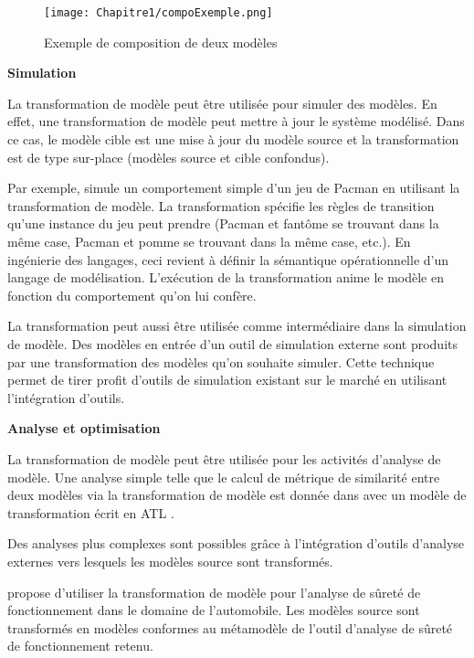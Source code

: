 \begin{description}
\begin{figure}[!htbp]
 \begin{center}
  \texttt{[image: Chapitre1/compoExemple.png]}
 \end{center}
 \caption{Exemple de composition de deux modèles}
 \label{fig:compoExemple}
\end{figure}

\item \textbf{Simulation}

La transformation de modèle peut être utilisée pour simuler des modèles. En effet, une transformation de modèle peut mettre à jour le système modélisé. Dans ce cas, le modèle cible est une mise à jour du modèle source et la transformation est de type sur-place (modèles source et cible confondus). 

Par exemple, \cite{syriani2011multi} simule un comportement simple d'un jeu de Pacman en utilisant la transformation de modèle. La transformation spécifie les règles de transition qu'une instance du jeu peut prendre (Pacman et fantôme se trouvant dans la même case, Pacman et pomme se trouvant dans la même case, etc.). En ingénierie des langages, ceci revient à définir la sémantique opérationnelle d'un langage de modélisation. L'exécution de la transformation anime le modèle en fonction du comportement qu'on lui confère.

La transformation peut aussi être utilisée comme intermédiaire dans la simulation de modèle. Des modèles en entrée d'un outil de simulation externe sont produits par une transformation des modèles qu'on souhaite simuler. Cette technique permet de tirer profit d'outils de simulation existant sur le marché en utilisant l'intégration d'outils.

\item \textbf{Analyse et optimisation}

La transformation de modèle peut être utilisée pour les activités d'analyse de modèle. Une analyse simple telle que le calcul de métrique de similarité entre deux modèles via la transformation de modèle est donnée dans \cite{del2007semi} avec un modèle de transformation écrit en ATL \cite{jouault2006transforming}. 

Des analyses plus complexes sont possibles grâce à l'intégration d'outils d'analyse externes vers lesquels les modèles source sont transformés.

\cite{biehl2010integrating} propose d'utiliser la transformation de modèle pour l'analyse de sûreté de fonctionnement dans le domaine de l'automobile. Les modèles source sont transformés en modèles conformes au métamodèle de l'outil d'analyse de sûreté de fonctionnement retenu.
 

\end{description}
